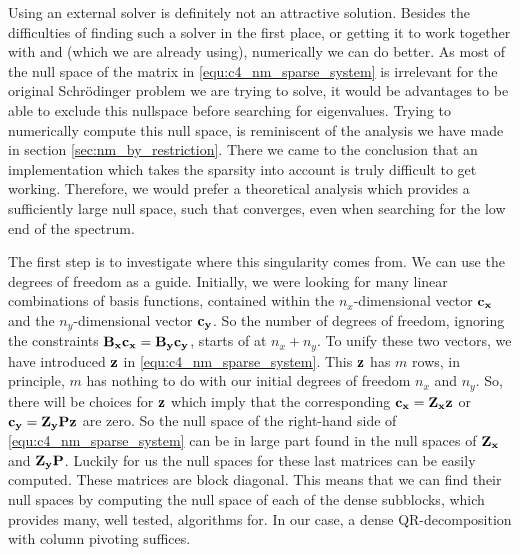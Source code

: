 Using an external solver is definitely not an attractive solution. Besides the difficulties of finding such a solver in the first place, or getting it to work together with \slepc{} and \Eigen{} (which we are already using), numerically we can do better. As most of the null space of the matrix in \eqref{equ:c4_nm_sparse_system} is irrelevant for the original Schrödinger problem we are trying to solve, it would be advantages to be able to exclude this nullspace before searching for eigenvalues. Trying to numerically compute this null space, is reminiscent of the analysis we have made in section \ref{sec:nm_by_restriction}. There we came to the conclusion that an implementation which takes the sparsity into account is truly difficult to get working. Therefore, we would prefer a theoretical analysis which provides a sufficiently large null space, such that \slepc{} converges, even when searching for the low end of the spectrum.

The first step is to investigate where this singularity comes from. We can use the degrees of freedom as a guide. Initially, we were looking for many linear combinations of basis functions, contained within the $n_x$-dimensional vector $\vb{c_x}$ and the $n_y$-dimensional vector $\vb{c_y}$. So the number of degrees of freedom, ignoring the constraints $\vb{B_x}\vb{c_x} = \vb{B_y}\vb{c_y}$, starts of at $n_x + n_y$. To unify these two vectors, we have introduced $\vb{z}$ in \eqref{equ:c4_nm_sparse_system}. This $\vb{z}$ has $m$ rows, in principle, $m$ has nothing to do with our initial degrees of freedom $n_x$ and $n_y$. So, there will be choices for $\vb{z}$ which imply that the corresponding $\vb{c_x} = \vb{Z_x} \vb{z}$
or $\vb{c_y} = \vb{Z_y} \vb{P} \vb{z}$ are zero. So the null space of the right-hand side of \eqref{equ:c4_nm_sparse_system} can be in large part found in the null spaces of $\vb{Z_x}$ and $\vb{Z_y} \vb{P}$. Luckily for us the null spaces for these last matrices can be easily computed. These matrices are block diagonal. This means that we can find their null spaces by computing the null space of each of the dense subblocks, which \Eigen{} provides many, well tested, algorithms for. In our case, a dense QR-decomposition with column pivoting suffices.

